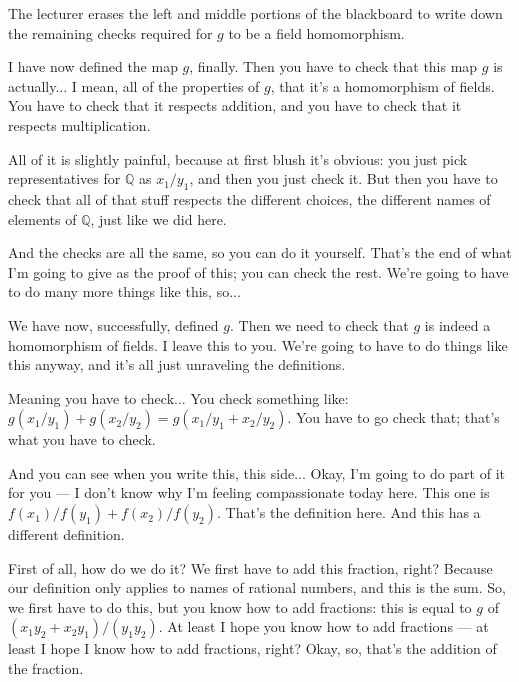 \begin{note}
The lecturer erases the left and middle portions of the blackboard to write down the remaining checks required for $g$ to be a field homomorphism.
\end{note}

\begin{speech}[00:28:48 - 00:30:05]
I have now defined the map $g$, finally. Then you have to check that this map $g$ is actually... I mean, all of the properties of $g$, that it's a homomorphism of fields. You have to check that it respects addition, and you have to check that it respects multiplication.

All of it is slightly painful, because at first blush it's obvious: you just pick representatives for $\mathbb{Q}$ as $x_1/y_1$, and then you just check it. But then you have to check that all of that stuff respects the different choices, the different names of elements of $\mathbb{Q}$, just like we did here.

And the checks are all the same, so you can do it yourself. That's the end of what I'm going to give as the proof of this; you can check the rest. We're going to have to do many more things like this, so...
\end{speech}

\begin{speech}[00:30:05 - 00:31:50]
We have now, successfully, defined $g$. Then we need to check that $g$ is indeed a homomorphism of fields.  I leave this to you. We're going to have to do things like this anyway, and it's all just unraveling the definitions.

Meaning you have to check...  You check something like:  $g(x_1/y_1) + g(x_2/y_2) = g(x_1/y_1 + x_2/y_2)$. You have to go check that; that's what you have to check.

And you can see when you write this, this side... Okay, I'm going to do part of it for you --- I don't know why I'm feeling compassionate today here. This one is $f(x_1)/f(y_1) + f(x_2)/f(y_2)$.  That's the definition here. And this has a different definition.

First of all, how do we do it? We first have to add this fraction, right? Because our definition only applies to names of rational numbers, and this is the sum. So, we first have to do this, but you know how to add fractions: this is equal to  $g$ of $(x_1 y_2 + x_2 y_1)/(y_1 y_2)$. At least I hope you know how to add fractions --- at least I hope I know how to add fractions, right? Okay, so, that's the addition of the fraction.
\end{speech}

